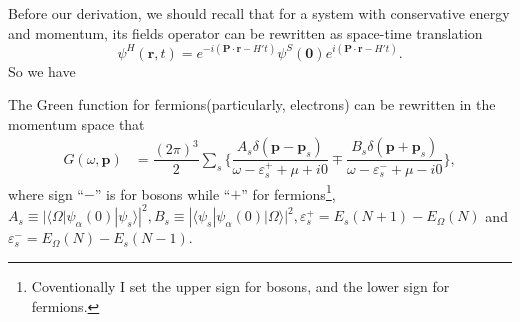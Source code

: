 \documentclass[b5paper,10pt,UTF8]{book}
\numberwithin{equation}{section}
\begin{document}
		Before our derivation, we should recall that for a system with conservative energy and momentum, its fields operator can be rewritten as space-time translation
		\begin{equation}\label{2.4.1}
			\psi^H(\bm{r},t)=e^{-i(\bm{P\cdot r}-H't)}\psi^S(\bm{0})e^{i(\bm{P\cdot r}-H't)}.
		\end{equation}
		So we have
		\begin{Proposition}
			The Green function for fermions(particularly, electrons) can be rewritten in the momentum space that
			\begin{align}
				G(\omega,\bm{p})&=\dfrac{(2\pi)^3}{2}\sum_s\bigg\{\dfrac{A_s\delta(\bm{p}-\bm{p}_s)}{\omega-\varepsilon_s^+ +\mu+i0}\mp\dfrac{B_s\delta(\bm{p}+\bm{p}_s)}{\omega-\varepsilon_s^- +\mu-i0}\bigg\},\label{2.4.2}
			\end{align}
			where sign ``$-$'' is for bosons while ``$+$'' for fermions\footnote{Coventionally I set the upper sign for bosons, and the lower sign for fermions.}, $A_s\equiv|\langle\Omega|\psi_\alpha(0)|\psi_s\rangle|^2, B_s\equiv|\langle \psi_s|\psi_\alpha(0)|\Omega\rangle|^2, \varepsilon_s^+ =E_s(N+1)-E_\Omega(N)$ and $\varepsilon_s^- =E_\Omega(N)-E_s(N-1)$.
		\end{Proposition}
\end{document}
